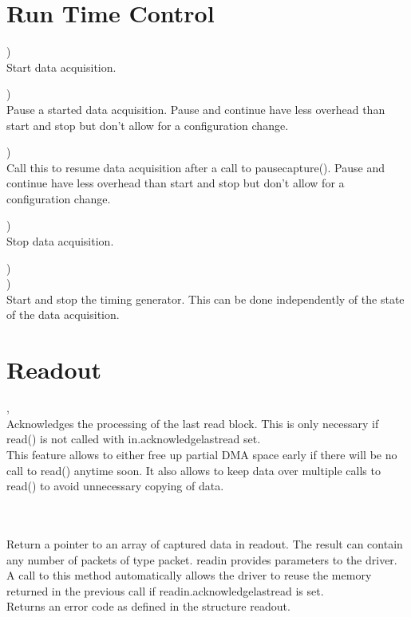 
\section{Run Time Control}
	\device)\\
	Start data acquisition.\par

	\device)\\
	Pause a started data acquisition. 
	Pause and continue have less overhead than start and stop but don't allow for a configuration change.\par

	\device)\\
	Call this to resume data acquisition after a call to \textsf{\prefix pause\tu capture()}.
	Pause and continue have less overhead than start and stop but don't allow for a configuration change.\par

	\device)\\
	Stop data acquisition.\par
	
	\device)\\
	\device)\\
	Start and stop the timing generator. This can be done independently of the state of the data acquisition.\par	

\section{Readout}
	\device, \\
	Acknowledges the processing of the last read block. This is only necessary if \textsf{\prefix read()} is not called with 
	\textsf{in.acknowledge\tu last\tu read} set.\\
	This feature allows to either free up partial DMA space early if there will be no call to \textsf{\prefix read()} anytime soon. 
	It also allows to keep data over multiple calls to \textsf{\prefix read()} to avoid unnecessary copying of data. \par

	\device {} \\ \\
	Return a pointer to an array of captured data in \textsf{read\tu out}. 
	The result can contain any number of packets of type \textsf{\prefix packet}.
	\textsf{read\tu in} provides parameters to the driver. 
	A call to this method automatically allows the driver to reuse the memory returned in the previous call if \textsf{read\tu in.acknowledge\tu last\tu read} is set.\\
	Returns an error code as defined in the structure \textsf{\prefix read\tu out}.


